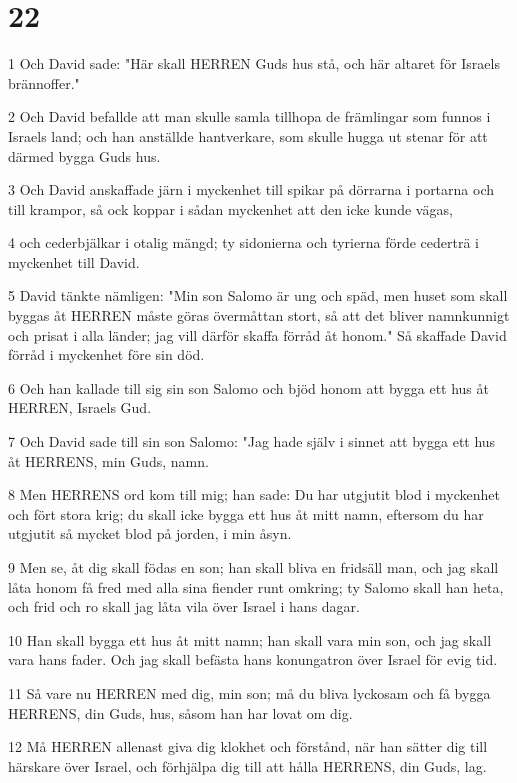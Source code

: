 \chapter{22}

\par 1 Och David sade: "Här skall HERREN Guds hus stå, och här altaret för Israels brännoffer."
\par 2 Och David befallde att man skulle samla tillhopa de främlingar som funnos i Israels land; och han anställde hantverkare, som skulle hugga ut stenar för att därmed bygga Guds hus.
\par 3 Och David anskaffade järn i myckenhet till spikar på dörrarna i portarna och till krampor, så ock koppar i sådan myckenhet att den icke kunde vägas,
\par 4 och cederbjälkar i otalig mängd; ty sidonierna och tyrierna förde cederträ i myckenhet till David.
\par 5 David tänkte nämligen: "Min son Salomo är ung och späd, men huset som skall byggas åt HERREN måste göras övermåttan stort, så att det bliver namnkunnigt och prisat i alla länder; jag vill därför skaffa förråd åt honom." Så skaffade David förråd i myckenhet före sin död.
\par 6 Och han kallade till sig sin son Salomo och bjöd honom att bygga ett hus åt HERREN, Israels Gud.
\par 7 Och David sade till sin son Salomo: "Jag hade själv i sinnet att bygga ett hus åt HERRENS, min Guds, namn.
\par 8 Men HERRENS ord kom till mig; han sade: Du har utgjutit blod i myckenhet och fört stora krig; du skall icke bygga ett hus åt mitt namn, eftersom du har utgjutit så mycket blod på jorden, i min åsyn.
\par 9 Men se, åt dig skall födas en son; han skall bliva en fridsäll man, och jag skall låta honom få fred med alla sina fiender runt omkring; ty Salomo skall han heta, och frid och ro skall jag låta vila över Israel i hans dagar.
\par 10 Han skall bygga ett hus åt mitt namn; han skall vara min son, och jag skall vara hans fader. Och jag skall befästa hans konungatron över Israel för evig tid.
\par 11 Så vare nu HERREN med dig, min son; må du bliva lyckosam och få bygga HERRENS, din Guds, hus, såsom han har lovat om dig.
\par 12 Må HERREN allenast giva dig klokhet och förstånd, när han sätter dig till härskare över Israel, och förhjälpa dig till att hålla HERRENS, din Guds, lag.
